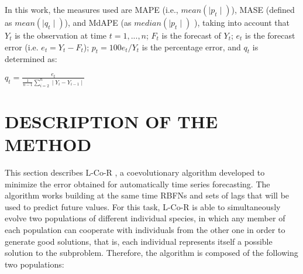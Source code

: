\documentclass[a4paper,twoside]{article}
\newcommand{\metodo}{L-Co-R}
\begin{document}
In this work, the measures used are MAPE (i.e., $mean(\mid p_t\mid)$), MASE (defined as $mean(\mid q_t\mid)$), and MdAPE (as $median(\mid p_t\mid)$ ), taking into account that $Y_t$ is the observation at time $t = {1,...,n}$; $F_t$ is the forecast of $Y_t$; $e_t$ is the forecast error (i.e. $e_t= Y_t - F_t$); $p_t = 100e_t/Y_t$ is the percentage error, and $q_t$ is determined as:

 \begin{center}
 \smallskip
 $q_t = \displaystyle\frac{e_t}{\displaystyle\frac{1}{n-1} \sum_{i=2}^n \mid Y_i - Y_{i-1} \mid }$
 \end{center}





\section{\uppercase{Description of the method}}
\label{sec:method}

\noindent This section describes {\metodo} \cite{Parras2012Softcomputing}, a coevolutionary algorithm developed to minimize the error obtained for automatically time series forecasting. The algorithm works building at the same time RBFNs and sets of lags that will be used to predict future values. For this task, {\metodo} is able to simultaneously evolve two populations of different individual species, in which any member of each population can cooperate with individuals from the other one in order to generate good solutions, that is, each individual represents itself a possible solution to the subproblem. Therefore, the algorithm is composed of the following two populations:
\end{document}
